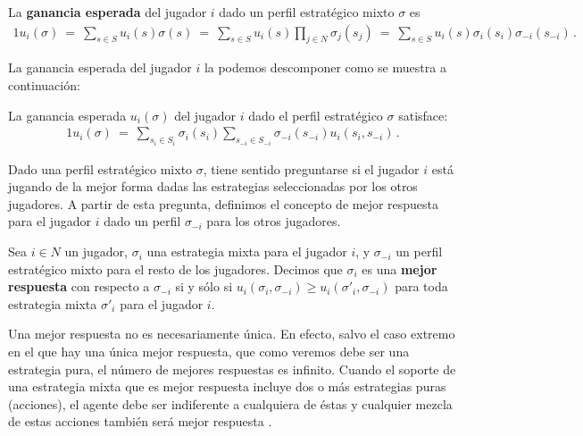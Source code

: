 \begin{definition}
\label{def:ganancia-esperada}
La \textbf{ganancia esperada} del jugador $i$ dado un perfil estratégico mixto $\sigma$ es
\begin{alignat}{1}
	u_i(\sigma)\ =\ \sum_{s \in S} u_i(s) \sigma(s)\ =\ \sum_{s \in S} u_i(s) \prod _{j \in N} \sigma_j(s_j)\ =\ \sum_{s \in S} u_i(s) \sigma_i(s_i) \sigma_{-i}(s_{-i})\,.
\end{alignat}
\end{definition}

La ganancia esperada del jugador $i$ la podemos descomponer como se muestra a continuación:

\begin{theorem}
\label{lemma:1}
La ganancia esperada $u_i(\sigma)$ del jugador $i$ dado el perfil estratégico $\sigma$ satisface:
\begin{alignat}{1}
u_i(\sigma)\ =\ \sum_{s_i\in S_i} \sigma_i(s_i) \sum_{s_{-i}\in S_{-i}} \sigma_{-i}(s_{-i}) u_i(s_i,s_{-i}) \,.
\end{alignat}
\end{theorem}

Dado una perfil estratégico mixto $\sigma$, tiene sentido preguntarse si el jugador $i$ está jugando de la mejor forma dadas las estrategias seleccionadas por los otros jugadores. A partir de esta pregunta, definimos el concepto de mejor respuesta para el jugador $i$ dado un perfil $\sigma_{-i}$ para los otros jugadores.


\begin{definition}
\label{def:mejor-respuesta}
Sea $i\in N$ un jugador, $\sigma_i$ una estrategia mixta para el jugador $i$, y $\sigma_{-i}$ un perfil estratégico mixto para el resto de los jugadores. Decimos que $\sigma_i$ es una \textbf{mejor respuesta} con respecto a $\sigma_{-i}$ si y s\'olo si
$u_i(\sigma_i,\sigma_{-i}) \geq u_i(\sigma'_i,\sigma_{-i})$ para toda estrategia mixta $\sigma'_i$ para el jugador $i$.
\end{definition}

Una mejor respuesta no es necesariamente única. En efecto, salvo el caso extremo en el que hay una única mejor respuesta, que como veremos debe ser una estrategia pura, el número de mejores respuestas es infinito. Cuando el soporte de una estrategia mixta que es mejor respuesta incluye dos o más estrategias puras (acciones), el agente debe ser indiferente a cualquiera de éstas y cualquier mezcla de estas  acciones también será mejor respuesta \cite{bib:tutorial-existence-nash}.

